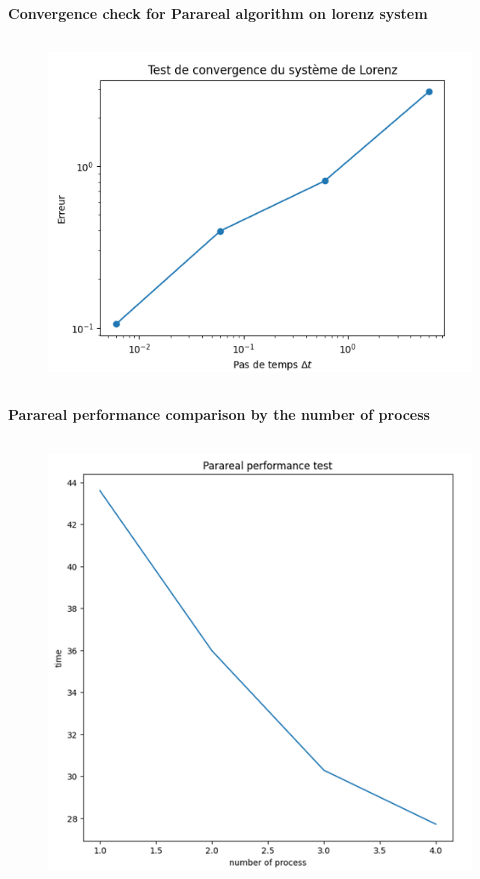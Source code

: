 \documentclass[
	11pt,
]{beamer}
\newcommand\myheading[1]{%
  \par\bigskip
  {\Large\bfseries#1}\par\smallskip}
\begin{document}
   \begin{frame}
   \myheading{ Convergence check for Parareal algorithm on lorenz system}
            \begin{column}{0.5\textwidth}
              \begin{figure}
                \includegraphics[width=1.\linewidth]{Convergence.png}
              \end{figure}  
            \end{column} 
   \end{frame}
   \begin{frame}
   \myheading{ Parareal performance comparison by the number of process}
            \begin{column}{0.5\textwidth}
              \begin{figure}
                \includegraphics[width=1.\linewidth]{Parareal_perfo.png}
              \end{figure}  
            \end{column} 
   \end{frame}
\end{document}
